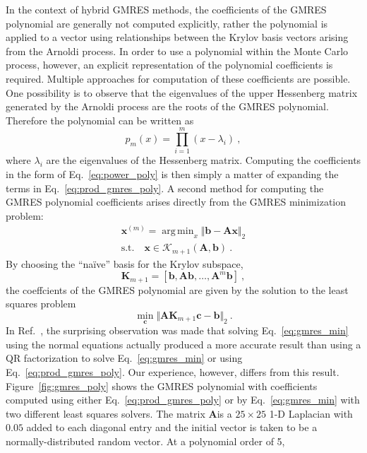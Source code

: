 \documentclass[10pt]{article}
\newcommand{\bx}{\ensuremath{\mathbf{x}}}
\newcommand{\bb}{\ensuremath{\mathbf{b}}}
\newcommand{\bc}{\ensuremath{\mathbf{c}}}
\newcommand{\bA}{\ensuremath{\mathbf{A}}}
\newcommand{\bK}{\ensuremath{\mathbf{K}}}
\newcommand{\calK}{\ensuremath{\mathcal{K}}}
\DeclareMathOperator*{\argmin}{arg\,min}
\begin{document}
In the context of hybrid GMRES methods, the coefficients of the GMRES polynomial
are generally not computed explicitly, rather the polynomial is applied
to a vector using relationships between the Krylov basis vectors arising from
the Arnoldi process.  In order to use a polynomial within the Monte Carlo
process, however, an explicit representation of the polynomial coefficients
is required.  Multiple approaches for computation of these coefficients
are possible.  One possibility is to observe that the eigenvalues of the
upper Hessenberg matrix generated by the Arnoldi process are the roots of the
GMRES polynomial.  Therefore the polynomial can be written as
\begin{equation}
p_m(x) = \prod_{i=1}^{m} (x - \lambda_i) \:, \label{eq:prod_gmres_poly}
\end{equation}
where $\lambda_i$ are the eigenvalues of the Hessenberg matrix.
Computing the coefficients in the form of Eq.~\eqref{eq:power_poly}
is then simply a matter of expanding the terms in Eq.~\eqref{eq:prod_gmres_poly}.
A second method for computing the GMRES polynomial coefficients arises
directly from the GMRES minimization problem:
\begin{align}
\bx^{(m)} = \argmin_x \Vert \bb - \bA \bx \Vert_2 \\
\text{s.t.} \quad \bx \in \calK_{m+1}(\bA,\bb) \:.
\end{align}
By choosing the ``na\"ive'' basis for the Krylov subspace,
\begin{equation}
\bK_{m+1} = \left[ \bb, \bA \bb, \ldots, \bA^m \bb \right] \:,
\end{equation}
the coeffcients of the GMRES polynomial are given by the solution to
the least squares problem
\begin{equation}
\min_{\bc} \Vert \bA \bK_{m+1} \bc - \bb \Vert_2 \:. \label{eq:gmres_min}
\end{equation}
In Ref.~\cite{liu_14}, the surprising observation was made that solving
Eq.~\eqref{eq:gmres_min} using the normal equations actually produced
a more accurate result than using a QR factorization to solve
Eq.~\eqref{eq:gmres_min} or using Eq.~\eqref{eq:prod_gmres_poly}.
Our experience, however, differs from this result.
Figure~\ref{fig:gmres_poly} shows the GMRES polynomial with coefficients
computed using either Eq.~\eqref{eq:prod_gmres_poly} or by
Eq.~\eqref{eq:gmres_min} with two different least squares solvers.
The matrix \bA is a $25 \times 25$ 1-D Laplacian with $0.05$ added
to each diagonal entry and the initial vector is taken to be a
normally-distributed random vector.  At a polynomial order of 5,
\end{document}
